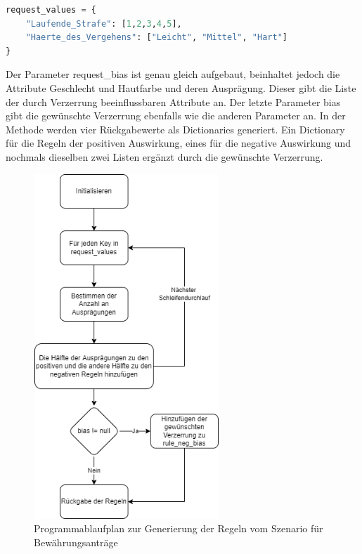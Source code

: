 \begin{onehalfspace}
\begin{lstlisting}[language=Python,label={lst:RequestValues},caption=Codezeilen zum Erstellen eines Dictionary mit den zur Bewertung relevanten Attributen]
request_values = {
    "Laufende_Strafe": [1,2,3,4,5],
    "Haerte_des_Vergehens": ["Leicht", "Mittel", "Hart"]
}
\end{lstlisting}
Der Parameter \glqq{}request\_bias\grqq{} ist genau gleich aufgebaut, beinhaltet jedoch die Attribute Geschlecht und Hautfarbe und deren Ausprägung. Dieser gibt die Liste der durch Verzerrung beeinflussbaren Attribute an. Der letzte Parameter \glqq{}bias\grqq{} gibt die gewünschte Verzerrung ebenfalls wie die anderen Parameter an. 
In der Methode werden vier Rückgabewerte als Dictionaries generiert. Ein Dictionary für die Regeln der positiven Auswirkung, eines für die negative Auswirkung und nochmals dieselben zwei Listen ergänzt durch die gewünschte Verzerrung. 
\begin{figure}[h]
    \centering
    \includegraphics[width=7cm,height=13cm]{Diagramme/Sz1_Regeln.drawio.png}
    \caption{Programmablaufplan zur Generierung der Regeln vom Szenario für Bewährungsanträge}
    \label{fig:Sz1Regeln}
\end{figure}\\

\end{onehalfspace}
